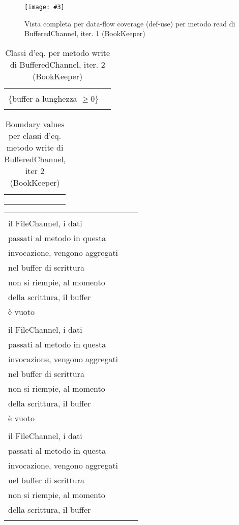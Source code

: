 \documentclass[10pt, a4paper]{article}
\newcommand{\Intmaketable}[4]{
	\begin{longtable}{#3}
	#4
	\caption{#2}
	\label{#1}
	\end{longtable}
}
\newcommand{\Intceqtable}[3]{
	\Intmaketable{#1}{#2}{|l|l|}{
	\hline
	\thead{Parametro formale} & \thead{Classi d'equivalenza} \\
	\hline
	\hline
	#3
	\hline}
}
\newcommand{\Intbvtable}[3]{
	\Intmaketable{#1}{#2}{|l|l|l|}{
	\hline
	\thead{Parametro formale} & \thead{Classe d'equivalenza} & \thead{Boundary value}\\
	\hline
	\hline
	#3
	\hline}
}
\newcommand{\Inttestctable}[3]{
	\Intmaketable{#1}{#2}{|l|l|l|}{
	\hline
	\thead{Input} & \thead{Esito atteso} & \thead{Motivazione}\\
	\hline
	\hline
	#3
	\hline}
}
\newcommand{\Intceqcaption}[4]{Classi d'eq. per metodo #1 di #2, iter. #3 (#4)}
\newcommand{\Intbvcaption}[4]{Boundary values per classi d'eq. metodo #1 di #2, iter #3 (#4)}
\newcommand{\Inttestccaption}[4]{Casi di test per metodo #1 di #2, iter. #3 (#4)}
\newcommand{\gettablelabel}[5]{table:#1:#2:#3:iter#4:proj#5}
\newcommand{\ceqtable}[5]{
	\Intceqtable{\gettablelabel{ceq}{#1}{#2}{#3}{#4}}
		{\Intceqcaption{#1}{#2}{#3}{#4}}
		{#5}
}
\newcommand{\bvtable}[5]{
	\Intbvtable{\gettablelabel{bv}{#1}{#2}{#3}{#4}}
		{\Intbvcaption{#1}{#2}{#3}{#4}}
		{#5}
}
\newcommand{\testctable}[5]{
	\Inttestctable{\gettablelabel{testc}{#1}{#2}{#3}{#4}}
		{\Inttestccaption{#1}{#2}{#3}{#4}}
		{#5}
}
\newcommand{\getpicturelabel}[1]{picture:#1}
\newcommand{\makepicture}[4]{
	\begin{figure}[H]
	\centering
	\texttt{[image: \#3]}
	\caption{#4}
	\label{\getpicturelabel{#3}}
	\end{figure}
}
\newcommand{\alldfcovcaption}[4]{Vista completa per data-flow coverage (def-use) per metodo #1 di #2, iter. #3 (#4)}
\newcommand{\tcell}{\makecell[tl]}
\newcommand{\newtrow}{\\ \hline}
\def\bookkeeper{BookKeeper}
\newcommand{\ceq}[1]{\{#1\}}
\begin{document}
	\makepicture{13cm}{15cm}{bk/dataflow-read-BufferedChannel-1}
				{\alldfcovcaption{read}{BufferedChannel}{1}{\bookkeeper}}
				
	
	\ceqtable{write}{BufferedChannel}{2}{\bookkeeper}{
			\tcell{src} & \tcell{
				\ceq{null}\\
				\ceq{buffer a lunghezza $\ge 0$}}
		\newtrow
	}
				
	\bvtable{write}{BufferedChannel}{2}{\bookkeeper}{
			\tcell{src} & \tcell{\ceq{null}} & \tcell{null}
		\newtrow
			\tcell{src} & \tcell{\ceq{buffer a lunghezza $\ge 0$}} & \tcell{ByteBuf("")}
		\newtrow
	}
	
	\testctable{write}{BufferedChannel}{2}{\bookkeeper}{
			\tcell{ByteBuf("")} & 
			\tcell{
				Nessuna interazione con\\
				il FileChannel, i dati\\
				passati al metodo in questa\\
				invocazione, vengono aggregati\\
				nel buffer di scrittura} & 	
			\tcell{
				Il buffer di scrittura\\
				non si riempie, al momento\\
				della scrittura, il buffer\\
				è vuoto}
		\newtrow
			\tcell{ByteBuf("random data")} &
			\tcell{
				Nessuna interazione con\\
				il FileChannel, i dati\\
				passati al metodo in questa\\
				invocazione, vengono aggregati\\
				nel buffer di scrittura} &
			\tcell{
				Il buffer di scrittura\\
				non si riempie, al momento\\
				della scrittura, il buffer\\
				è vuoto}
		\newtrow
			\tcell{ByteBuf("more random data")} &
			\tcell{
				Nessuna interazione con\\
				il FileChannel, i dati\\
				passati al metodo in questa\\
				invocazione, vengono aggregati\\
				nel buffer di scrittura} &
			\tcell{
				Il buffer di scrittura\\
				non si riempie, al momento\\
				della scrittura, il buffer\\
}}
\end{document}
